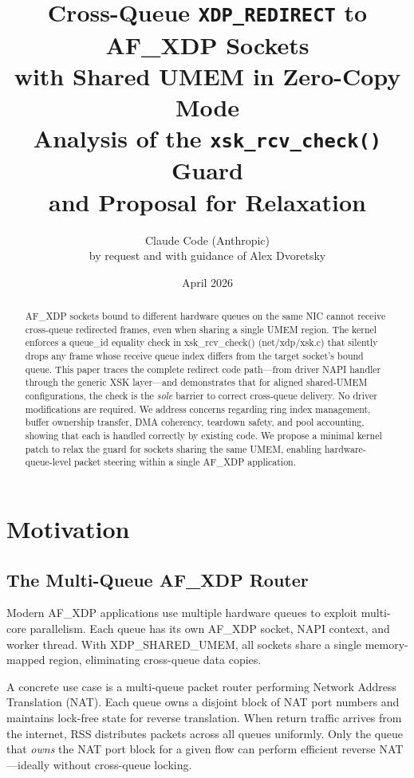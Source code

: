 \documentclass[11pt,a4paper]{article}
\title{%
    \Large Cross-Queue \texttt{XDP\_REDIRECT} to AF\_XDP Sockets\\
    with Shared UMEM in Zero-Copy Mode\\[0.5em]
    \large Analysis of the \texttt{xsk\_rcv\_check()} Guard\\
    and Proposal for Relaxation
}
\author{Claude Code (Anthropic)\\[0.3em]
    \normalsize by request and with guidance of Alex Dvoretsky}
\date{April 2026}
\renewcommand{\texttt}[1]{{\ttfamily\hyphenpenalty=10000\exhyphenpenalty=10000 #1}}
\begin{document}
\maketitle

\begin{abstract}
AF\_XDP sockets bound to different hardware queues on the same NIC cannot
receive cross-queue redirected frames, even when sharing a single UMEM region.
The kernel enforces a \texttt{queue\_id} equality check in
\texttt{xsk\_rcv\_check()} (net/xdp/xsk.c) that silently drops any frame
whose receive queue index differs from the target socket's bound queue.
This paper traces the complete redirect code path---from driver NAPI handler
through the generic XSK layer---and demonstrates that for aligned shared-UMEM
configurations, the check is the \emph{sole} barrier to correct cross-queue
delivery. No driver modifications are required. We address concerns regarding
ring index management, buffer ownership transfer, DMA coherency, teardown
safety, and pool accounting, showing that each is handled correctly by
existing code. We propose a minimal kernel patch to relax the guard for
sockets sharing the same UMEM, enabling hardware-queue-level packet steering
within a single AF\_XDP application.
\end{abstract}

\tableofcontents

\section{Motivation}

\subsection{The Multi-Queue AF\_XDP Router}

Modern AF\_XDP applications use multiple hardware queues to exploit
multi-core parallelism. Each queue has its own AF\_XDP socket, NAPI context,
and worker thread. With \texttt{XDP\_SHARED\_UMEM}, all sockets share a
single memory-mapped region, eliminating cross-queue data copies.

A concrete use case is a multi-queue packet router performing Network Address
Translation (NAT). Each queue owns a disjoint block of NAT port numbers and
maintains lock-free state for reverse translation. When return traffic arrives
from the internet, RSS distributes packets across all queues uniformly. Only
the queue that \emph{owns} the NAT port block for a given flow can perform
efficient reverse NAT---ideally without cross-queue locking.
\end{document}
